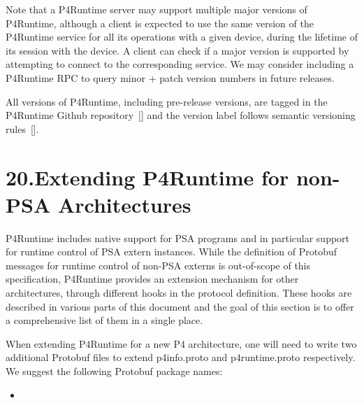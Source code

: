 \documentclass[11pt]{article}
\begin{document}
{%
Note that a P4Runtime server may support multiple major versions of P4Runtime,
although a client is expected to use the same version of the P4Runtime service
for all its operations with a given device, during the lifetime of its session
with the device. A client can check if a major version is supported by
attempting to connect to the corresponding service. We may consider including a
P4Runtime RPC to query minor + patch version numbers in future releases.%

All versions of P4Runtime, including pre-release versions, are tagged in the
P4Runtime Github repository~[] and the version label follows
semantic versioning rules~[].%

\section{20.\hspace*{0.5em}Extending P4Runtime for non-PSA Architectures}\label{sec-extending-p4runtime}%

\noindent{}P4Runtime includes native support for PSA programs and in particular support for
runtime control of PSA extern instances. While the definition of Protobuf
messages for runtime control of non-PSA externs is out-of-scope of this
specification, P4Runtime provides an extension mechanism for other
architectures, through different hooks in the protocol definition. These hooks
are described in various parts of this document and the goal of this section is
to offer a comprehensive list of them in a single place.%

When extending P4Runtime for a new P4 architecture, one will need to write two
additional Protobuf files to extend p4info.proto and p4runtime.proto
respectively. We suggest the following Protobuf package names:%

\begin{itemize}[noitemsep,topsep=\mdcompacttopsep]%

\item{}%


\end{itemize}}
\end{document}
